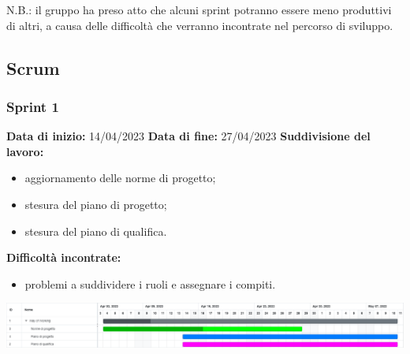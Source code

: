 \documentclass[a4paper, 12pt]{article}
\begin{document}
N.B.: il gruppo ha preso atto che alcuni sprint potranno essere meno produttivi di altri, a causa delle difficoltà che verranno incontrate nel percorso di sviluppo.


\newpage

\subsection{Scrum}\label{Scrum}

\subsubsection{Sprint 1}
\textbf{Data di inizio:} 14/04/2023\newline
\textbf{Data di fine:} 27/04/2023\newline
\newline
\textbf{Suddivisione del lavoro:}
\begin{itemize}
    \item aggiornamento delle norme di progetto;
    \item stesura del piano di progetto;
    \item stesura del piano di qualifica.
\end{itemize}
\textbf{Difficoltà incontrate:}
\begin{itemize}
    \item problemi a suddividere i ruoli e assegnare i compiti.
\end{itemize}
\includegraphics[scale=0.24]{WoW_1.png}\newline
\newline
\end{document}
